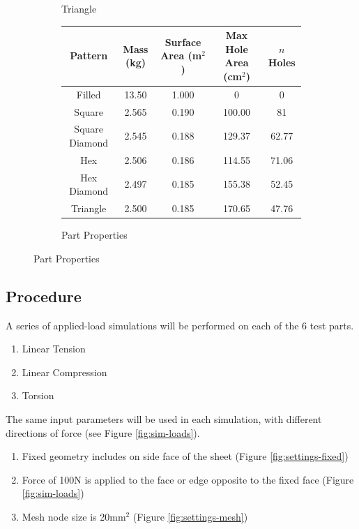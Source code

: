 \documentclass[12pt, letterpaper]{article}
\begin{document}
\begin{figure}[H]
\begin{subfigure}[b]{.3\linewidth}
		\caption{Triangle}
	\end{subfigure}
	\begin{subfigure}[b]{\linewidth}
	\begingroup
	\setlength{\tabcolsep}{10pt} %
	\renewcommand{\arraystretch}{1.5} %
		\begin{tabular}{ | c | c | c | c | c | }\hline
			Pattern 			& Mass (kg) 	& Surface Area (m$^2$)	& Max Hole Area (cm$^2$) 	& $n$ Holes 	\\\hline
			Filled				& 13.50 		& 1.000 						& 0			 					& 0			\\\hline
			Square			& 2.565 		& 0.190 						& 100.00		 					& 81			\\\hline
			Square Diamond	& 2.545 		& 0.188 						& 129.37	 						& 62.77		\\\hline
			Hex				& 2.506 		& 0.186 						& 114.55	 						& 71.06		\\\hline
			Hex Diamond		& 2.497 		& 0.185 						& 155.38	 						& 52.45		\\\hline
			Triangle			& 2.500 		& 0.185						& 170.65				 			& 47.76		\\\hline
		\end{tabular}
		\caption{Part Properties}
	\endgroup
	\end{subfigure}
\end{figure}

\newpage
\subsection{Procedure}
\label{sec:procedure}

A series of applied-load simulations will be performed on each of the 6 test parts. 

\begin{enumerate}
\item Linear Tension
\item Linear Compression
\item Torsion
\end{enumerate}

The same input parameters will be used in each simulation, with different directions of force (see Figure \ref{fig:sim-loads}). 

\begin{enumerate}
\item Fixed geometry includes on side face of the sheet (Figure \ref{fig:settings-fixed})
\item Force of 100N is applied to the face or edge opposite to the fixed face (Figure \ref{fig:sim-loads})
\item Mesh node size is 20mm$^2$ (Figure \ref{fig:settings-mesh})
\end{enumerate}
\end{document}
